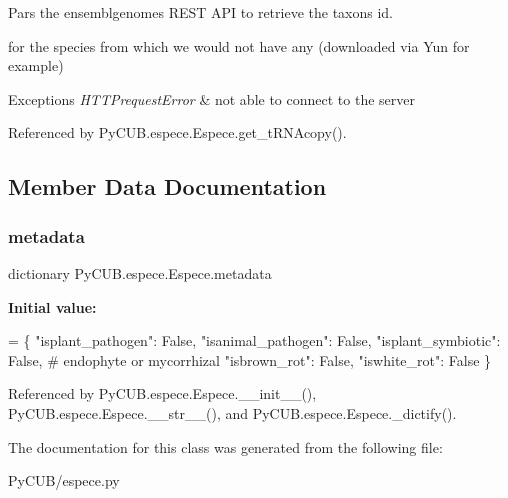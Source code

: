 Pars the ensemblgenomes R\+E\+ST A\+PI to retrieve the taxons id. 

for the species from which we would not have any (downloaded via Yun for example)


\begin{DoxyExceptions}{Exceptions}
{\em H\+T\+T\+Prequest\+Error} & not able to connect to the server \\
\hline
\end{DoxyExceptions}


Referenced by Py\+C\+U\+B.\+espece.\+Espece.\+get\+\_\+t\+R\+N\+Acopy().



\subsection{Member Data Documentation}
\mbox{\label{class_py_c_u_b_1_1espece_1_1_espece_a0a27801c75339436b18b7e865b890a00}} 
\subsubsection{\texorpdfstring{metadata}{metadata}}
{\footnotesize\ttfamily dictionary Py\+C\+U\+B.\+espece.\+Espece.\+metadata\hspace{0.3cm}{\ttfamily [static]}}

{\bfseries Initial value\+:}
\begin{DoxyCode}
=  \{
        \textcolor{stringliteral}{"isplant\_pathogen"}: \textcolor{keyword}{False},
        \textcolor{stringliteral}{"isanimal\_pathogen"}: \textcolor{keyword}{False},
        \textcolor{stringliteral}{"isplant\_symbiotic"}: \textcolor{keyword}{False},  \textcolor{comment}{# endophyte or mycorrhizal}
        \textcolor{stringliteral}{"isbrown\_rot"}: \textcolor{keyword}{False},
        \textcolor{stringliteral}{"iswhite\_rot"}: \textcolor{keyword}{False}
    \}
\end{DoxyCode}


Referenced by Py\+C\+U\+B.\+espece.\+Espece.\+\_\+\+\_\+init\+\_\+\+\_\+(), Py\+C\+U\+B.\+espece.\+Espece.\+\_\+\+\_\+str\+\_\+\+\_\+(), and Py\+C\+U\+B.\+espece.\+Espece.\+\_\+dictify().



The documentation for this class was generated from the following file\+:\begin{DoxyCompactItemize}
\item 
Py\+C\+U\+B/espece.\+py\end{DoxyCompactItemize}
